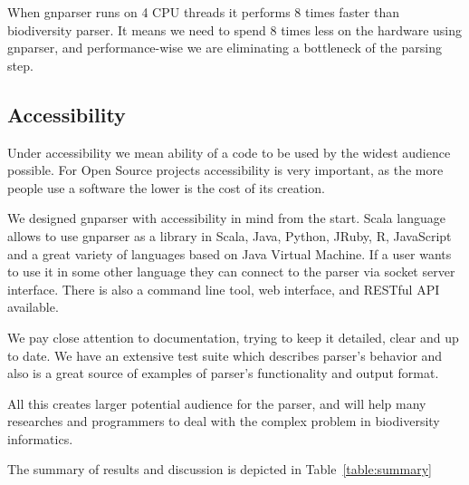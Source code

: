 \documentclass{bmcart}
\begin{document}
When gnparser runs on 4 CPU threads it performs 8 times faster than
biodiversity parser. It means we need to spend 8 times less on the hardware
using gnparser, and performance-wise we are eliminating a bottleneck of the
parsing step.

\subsection*{Accessibility}

Under accessibility we mean ability of a code to be used by the widest
audience possible. For Open Source projects accessibility is very important,
as the more people use a software the lower is the cost of its creation.

We designed gnparser with accessibility in mind from the start.  Scala
language allows to use gnparser as a library in Scala, Java, Python, JRuby, R,
JavaScript and a great variety of languages based on Java Virtual Machine. If
a user wants to use it in some other language they can connect to the parser
via socket server interface. There is also a command line tool, web interface,
and RESTful API available.

We pay close attention to documentation, trying to keep it detailed, clear and
up to date. We have an extensive test suite which describes parser's behavior
and also is a great source of examples of parser's functionality and output
format.

All this creates larger potential audience for the parser, and will help many
researches and programmers to deal with the complex problem in biodiversity
informatics.

The summary of results and discussion is depicted in
Table~\ref{table:summary}
\end{document}
